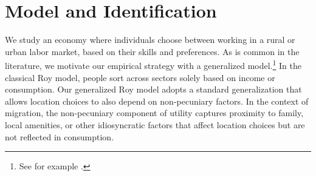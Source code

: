 \section{Model and Identification}\label{sec:model_identification}


We study an economy where individuals choose between working in a rural or urban labor market, based on their skills and preferences. 
As is common in the literature, we motivate our empirical strategy with a generalized \cite{royThoughtsDistributionEarnings1951} model.\footnote{See for example \citealt{bazziSkillTransferabilityMigration2016, alvarezAgriculturalWageGap2020, lagakosSelectionAgricultureCrossCountry2013,pulidoBarriersMobilitySorting2021}.} 
In the classical Roy model, people sort across sectors solely based on income or consumption.
Our generalized Roy model adopts a standard generalization that allows location choices to also depend on non-pecuniary factors. 
In the context of migration, the non-pecuniary component of utility captures proximity to family, local amenities, or other idiosyncratic factors that affect location choices but are not reflected in consumption.


